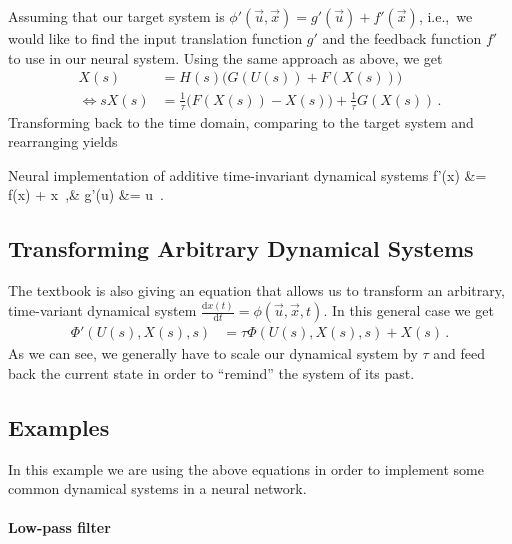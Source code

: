 \documentclass[10pt,letterpaper,oneside]{article}
\begin{document}
Assuming that our target system is $\phi '(\vec u, \vec x) = g'(\vec u) + f'(\vec x)$, i.e.,~we would like to find the input translation function $g'$ and the feedback function $f'$ to use in our neural system. Using the same approach as above, we get
\begin{align*}
	X(s) &= H(s) \big(G(U(s)) + F(X(s))\big) \\
	\Leftrightarrow s X(s) &= \frac{1}{\tau} \big( F(X(s)) - X(s) \big) + \frac{1}{\tau} G(X(s))  \,.
\end{align*}
Transforming back to the time domain, comparing to the target system and rearranging yields
\begin{ImportantEqn}{Neural implementation of additive time-invariant dynamical systems}
	f'(\vec x) &= \tau f(\vec x) + \vec x \,,& g'(\vec u) &= \tau \vec u \,.
	\label{eqn:nef_additive_dyn}
\end{ImportantEqn}


\subsection{Transforming Arbitrary Dynamical Systems}

The textbook is also giving an equation that allows us to transform an arbitrary, time-variant dynamical system $\frac{\mathrm{d}x(t)}{\mathrm{d}t} = \phi(\vec u, \vec x, t)$. In this general case we get
\begin{align*}
	\Phi'(U(s), X(s), s) &= \tau \Phi(U(s), X(s), s) + X(s) \,.
\end{align*}
As we can see, we generally have to scale our dynamical system by $\tau$ and feed back the current state in order to \enquote{remind} the system of its past.

\subsection{Examples}

In this example we are using the above equations in order to implement some common dynamical systems in a neural network.

\paragraph{Low-pass filter}
\end{document}
